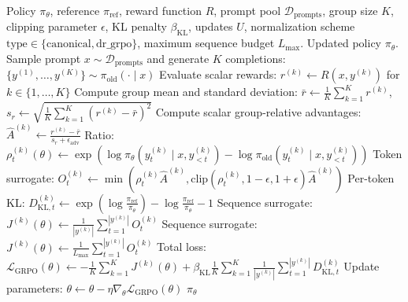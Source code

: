 \documentclass{article}
\begin{document}
\begin{algorithm}[H]
\caption{Group Relative Policy Optimization (GRPO) Continuation}\label{alg:grpo}
\begin{algorithmic}[1]
\Require Policy $\pi_\theta$, reference $\pi_{\text{ref}}$, reward function $R$, prompt pool $\mathcal{D}_{\text{prompts}}$, group size $K$, clipping parameter $\epsilon$, KL penalty $\beta_{\text{KL}}$, updates $U$, normalization scheme $\text{type} \in \{\text{canonical}, \text{dr\_grpo}\}$, maximum sequence budget $L_{\max}$.
\Ensure Updated policy $\pi_\theta$.
  \State Sample prompt $x \sim \mathcal{D}_{\text{prompts}}$ and generate $K$ completions: $\{y^{(1)}, \dots, y^{(K)}\} \sim \pi_{\text{old}}(\cdot \mid x)$
  \State Evaluate scalar rewards: $r^{(k)} \gets R(x, y^{(k)})$ for $k \in \{1, \dots, K\}$
  \State Compute group mean and standard deviation: $\bar{r} \gets \frac{1}{K}\sum_{k=1}^K r^{(k)}$, $s_r \gets \sqrt{\frac{1}{K}\sum_{k=1}^K (r^{(k)} - \bar{r})^2}$
  \State Compute scalar group-relative advantages: $\hat{A}^{(k)} \gets \frac{r^{(k)} - \bar{r}}{s_r + \epsilon_{\text{adv}}}$
      \State Ratio: $\rho_t^{(k)}(\theta) \gets \exp\left(\log \pi_\theta(y_t^{(k)} \mid x, y_{<t}^{(k)}) - \log \pi_{\text{old}}(y_t^{(k)} \mid x, y_{<t}^{(k)})\right)$
      \State Token surrogate: $O_t^{(k)} \gets \min\left(\rho_t^{(k)}\hat{A}^{(k)}, \text{clip}(\rho_t^{(k)}, 1-\epsilon, 1+\epsilon)\hat{A}^{(k)}\right)$
      \State Per-token KL: $D_{\text{KL}, t}^{(k)} \gets \exp\left(\log \frac{\pi_{\text{ref}}}{\pi_\theta}\right) - \log \frac{\pi_{\text{ref}}}{\pi_\theta} - 1$
    \EndFor
      \State Sequence surrogate: $J^{(k)}(\theta) \gets \frac{1}{|y^{(k)}|} \sum_{t=1}^{|y^{(k)}|} O_t^{(k)}$ 
      \State Sequence surrogate: $J^{(k)}(\theta) \gets \frac{1}{L_{\max}} \sum_{t=1}^{|y^{(k)}|} O_t^{(k)}$ 
    \EndIf
  \EndFor
  \State Total loss: $\mathcal{L}_{\text{GRPO}}(\theta) \gets - \frac{1}{K} \sum_{k=1}^K J^{(k)}(\theta) + \beta_{\text{KL}} \frac{1}{K} \sum_{k=1}^K \frac{1}{|y^{(k)}|} \sum_{t=1}^{|y^{(k)}|} D_{\text{KL}, t}^{(k)}$
  \State Update parameters: $\theta \gets \theta - \eta \nabla_\theta \mathcal{L}_{\text{GRPO}}(\theta)$
\EndFor
\State \Return $\pi_\theta$
\end{algorithmic}
\end{algorithm}
\end{document}
